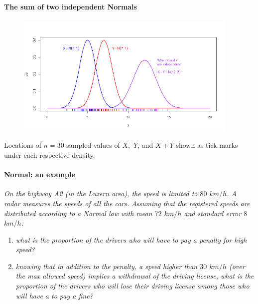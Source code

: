 \documentclass[notes=show,smaller]{beamer}\usepackage[]{graphicx}\usepackage[]{color}
\begin{document}
\begin{frame}{\subsecname}
\framesubtitle{The sum of two independent Normals}
  \begin{figure}[ptb]\centering
  \includegraphics[width=0.95\textwidth,height=0.7\textheight]{img/sum_of_two_independent_normals_with_rug__1.pdf}%
  \end{figure}

  Locations of $n=30$ sampled values of $X,$ $Y$, and $X+Y$ shown as tick marks under each respective density.
\end{frame}


\begin{frame}{\subsecname}

\framesubtitle{Normal: an example}

  \begin{example}
  \begin{footnotesize}
  \textit{On the highway A2 (in the Luzern area), the speed is limited to $80$ $km/h$. A radar measures the speeds of all the cars.}
  \textit{Assuming that the registered speeds are distributed according to a Normal law with mean $72$ $km/h$ and standard error $8$ $km/h$:} \medskip
  \begin{enumerate}
    \item \textit{what is the proportion of the drivers who will have to pay a penalty for high speed?} \medskip
    \item \textit{knowing that in addition to the penalty, a speed higher than $30$ $km/h$ (over the max allowed speed) implies a withdrawal of the driving license, what is the proportion of the drivers who  will lose their driving license among those who will have a to pay a fine?}
  \end{enumerate}
  \end{footnotesize}
  \end{example}
\end{frame}
\end{document}
